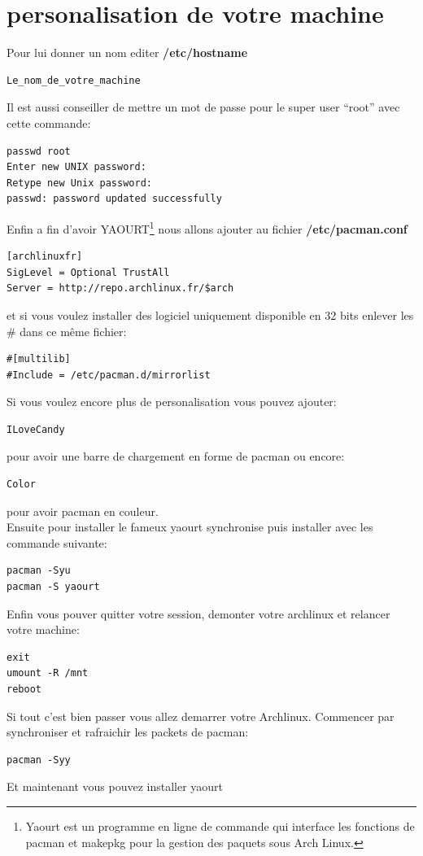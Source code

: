 \documentclass[a4paper]{book}
\begin{document}
\chapter{personalisation de votre machine}
Pour lui donner un nom editer \textbf{/etc/hostname}
\begin{verbatim}
Le_nom_de_votre_machine
\end{verbatim}
Il est aussi conseiller de mettre un mot de passe pour le super user ``root''
avec cette commande\@:
\begin{verbatim}
passwd root
Enter new UNIX password:
Retype new Unix password:
passwd: password updated successfully
\end{verbatim}
Enfin a fin d'avoir YAOURT\footnote{Yaourt est un programme en ligne de 
  commande qui interface les fonctions de pacman et makepkg pour la gestion 
des paquets sous Arch Linux.} nous allons ajouter au fichier
\textbf{/etc/pacman.conf}
\begin{verbatim}
[archlinuxfr]
SigLevel = Optional TrustAll
Server = http://repo.archlinux.fr/$arch
\end{verbatim}
et si vous voulez installer des logiciel uniquement disponible en 32 bits enlever les \#
dans ce même fichier\@:
\begin{verbatim}
#[multilib]
#Include = /etc/pacman.d/mirrorlist
\end{verbatim}
Si vous voulez encore plus de personalisation vous pouvez ajouter\@:
\begin{verbatim}
ILoveCandy
\end{verbatim}
pour avoir une barre de chargement en forme de pacman ou encore\@:
\begin{verbatim}
Color
\end{verbatim}
pour avoir pacman en couleur.\\
Ensuite pour installer le fameux yaourt synchronise puis installer avec les
commande suivante\@:
\begin{verbatim}
pacman -Syu
pacman -S yaourt
\end{verbatim}
Enfin vous pouver quitter votre session, demonter votre archlinux et relancer
votre machine\@:
\begin{verbatim}
exit
umount -R /mnt
reboot
\end{verbatim}
Si tout c'est bien passer vous allez demarrer votre Archlinux.
Commencer par synchroniser et rafraichir les packets de pacman\@:
\begin{verbatim}
pacman -Syy
\end{verbatim}
Et maintenant vous pouvez installer yaourt
\end{document}
